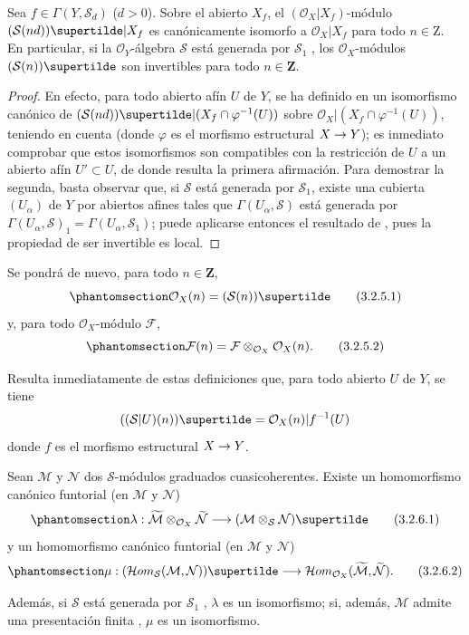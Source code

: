 \documentclass[oneside,10pt]{amsart}
\makeatletter
\newcommand{\ega@arrow}[2]{\mathchoice{#1}{#2}{#2}{#2}}
\renewcommand{\to}{\ega@arrow{\longrightarrow}{\rightarrow}}
\let\EGAOriginalLabel\label
\renewcommand{\label}[1]{\phantomsection\EGAOriginalLabel{#1}}
\makeatother
\begin{document}
\begin{proposition}[3.2.5]
\label{II.3.2.5-fr}
Sea $f\in\Gamma(Y,\mathcal{S}_d)$ ($d>0$).
Sobre el abierto $X_f$, el $(\mathcal{O}_X|X_f)$-módulo $(\mathcal{S}(nd))\supertilde|X_f$ es canónicamente isomorfo a $\mathcal{O}_X|X_f$ para todo $n\in\mathrm{Z}$.
En particular, si la $\mathcal{O}_Y$-álgebra $\mathcal{S}$ está generada por $\mathcal{S}_1$ , los $\mathcal{O}_X$-módulos $(\mathcal{S}(n))\supertilde$ son invertibles para todo $n\in\mathbf{Z}$.
\end{proposition}

\begin{proof}
En efecto, para todo abierto afín $U$ de $Y$, se ha definido en  un isomorfismo canónico de $(\mathcal{S}(nd))\supertilde|(X_f\cap\varphi^{-1}(U))$ sobre $\mathcal{O}_X|(X_f\cap\varphi^{-1}(U))$, teniendo en cuenta  (donde $\varphi$ es el morfismo estructural $X\to Y$); es inmediato comprobar que estos isomorfismos son compatibles con la restricción de $U$ a un abierto afín $U'\subset U$, de donde resulta la primera afirmación.
Para demostrar la segunda, basta observar que, si $\mathcal{S}$ está generada por $\mathcal{S}_1$, existe una cubierta $(U_\alpha)$ de $Y$ por abiertos afines tales que $\Gamma(U_\alpha,\mathcal{S})$ está generada por $\Gamma(U_\alpha,\mathcal{S})_1=\Gamma(U_\alpha,\mathcal{S}_1)$; puede aplicarse entonces el resultado de , pues la propiedad de ser invertible es local.
\end{proof}

Se pondrá de nuevo, para todo $n\in\mathbf{Z}$,
\[
\label{II.3.2.5.1-fr}
  \mathcal{O}_X(n)=(\mathcal{S}(n))\supertilde
\tag{3.2.5.1}
\]
y, para todo $\mathcal{O}_X$-módulo $\mathcal{F}$,
\[
\label{II.3.2.5.2-fr}
  \mathcal{F}(n)=\mathcal{F}\otimes_{\mathcal{O}_X}\mathcal{O}_X(n).
\tag{3.2.5.2}
\]

Resulta inmediatamente de estas definiciones que, para todo abierto $U$ de $Y$, se tiene
\[
  ((\mathcal{S}|U)(n))\supertilde
  =\mathcal{O}_X(n)|f^{-1}(U)
\]
donde $f$ es el morfismo estructural $X\to Y$.

\begin{proposition}[3.2.6]
\label{II.3.2.6-fr}
Sean $\mathcal{M}$ y $\mathcal{N}$ dos $\mathcal{S}$-módulos graduados cuasicoherentes.
Existe un homomorfismo canónico funtorial (en $\mathcal{M}$ y $\mathcal{N}$)
\[
\label{II.3.2.6.1-fr}
  \lambda:\widetilde{\mathcal{M}}
  \otimes_{\mathcal{O}_X}\widetilde{\mathcal{N}}
  \longrightarrow(\mathcal{M}\otimes_{\mathcal{S}}\mathcal{N})\supertilde
\tag{3.2.6.1}
\]
y un homomorfismo canónico funtorial (en $\mathcal{M}$ y $\mathcal{N}$)
\[
\label{II.3.2.6.2-fr}
  \mu:(\mathcal{H}om_{\mathcal{S}}(\mathcal{M},\mathcal{N}))\supertilde
  \longrightarrow
  \mathcal{H}om_{\mathcal{O}_X}
  (\widetilde{\mathcal{M}},\widetilde{\mathcal{N}}).
\tag{3.2.6.2}
\]

Además, si $\mathcal{S}$ está generada por $\mathcal{S}_1$ , $\lambda$ es un isomorfismo; si, además, $\mathcal{M}$ admite una presentación finita , $\mu$ es un isomorfismo.
\end{proposition}
\end{document}
